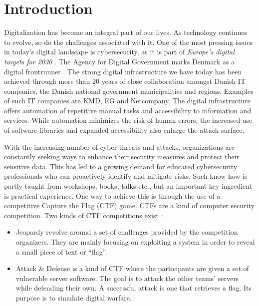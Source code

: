 
{ \hypersetup{hidelinks} \tableofcontents {}}

\newpage
{}
\setcounter{page}{1}

\chapter{Introduction}
Digitalization has become an integral part of our lives. As technology continues to evolve, so do the challenges associated with it. One of the most pressing issues in today's digital landscape is cybersecurity, as it is part of \textit{Europe's digital targets for 2030} \cite{europe_digital_decade}. The Agency for Digital Government marks Denmark as a digital frontrunner \cite{danish_digital_journey}. The strong digital infrastructure we have today has been achieved through more than 20 years of close collaboration amongst Danish IT companies, the Danish national government municipalities and regions. Examples of such IT companies are KMD, EG and Netcompany. The digital infrastructure offers automation of repetitive manual tasks and accessibility to information and services. While automation minimizes the risk of human errors, the increased use of software libraries and expanded accessibility also enlarge the attack surface.

With the increasing number of cyber threats and attacks, organizations are constantly seeking ways to enhance their security measures and protect their sensitive data. This has led to a growing demand for educated cybersecurity professionals who can proactively identify and mitigate risks. Such know-how is partly taught from workshops, books, talks etc., but an important key ingredient is practical experience. One way to achieve this is through the use of a competitive Capture the Flag (CTF) game. CTFs are a kind of computer security competition. Two kinds of CTF competitions exist \cite{ctf_overview}: 

\begin{itemize}
    \item Jeopardy revolve around a set of challenges provided by the competition organizers. They are mainly focusing on exploiting a system in order to reveal a small piece of text or ``flag''. 
    \item Attack \& Defense is a kind of CTF where the participants are given a set of vulnerable server software. The goal is to attack the other teams' servers while defending their own. A successful attack is one that retrieves a flag. Its purpose is to simulate digital warfare.
\end{itemize}

